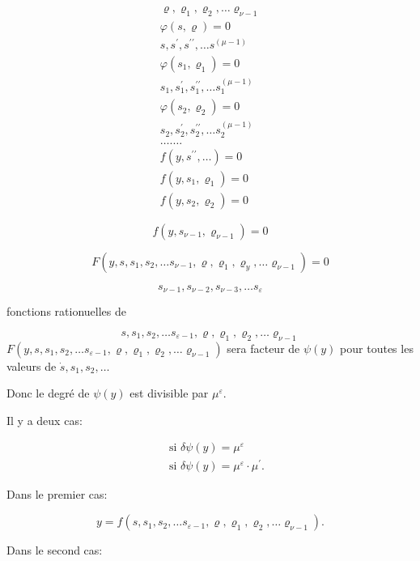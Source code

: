 \documentclass{article}
\begin{document}
\[
\begin{gathered}
\varrho, \varrho_{1}, \varrho_{2}, \ldots \varrho_{\nu-1} \\
\varphi(s, \varrho)=0 \\
s, s^{\prime}, s^{\prime \prime}, \ldots s^{(\mu-1)} \\
\varphi\left(s_{1}, \varrho_{1}\right)=0 \\
s_{1}, s_{1}^{\prime}, s_{1}^{\prime \prime}, \ldots s_{1}^{(\mu-1)} \\
\varphi\left(s_{2}, \varrho_{2}\right)=0 \\
s_{2}, s_{2}^{\prime}, s_{2}^{\prime \prime}, \ldots s_{2}^{(\mu-1)} \\
\ldots . \ldots \\
f\left(y, s^{\prime \prime}, \ldots\right)=0 \\
f\left(y, s_{1}, \varrho_{1}\right)=0 \\
f\left(y, s_{2}, \varrho_{2}\right)=0
\end{gathered}
\]

\[
f\left(y, s_{\nu-1}, \varrho_{\nu-1}\right)=0
\]

\[
F\left(y, s, s_{1}, s_{2}, \ldots s_{\nu-1}, \varrho, \varrho_{1}, \varrho_{y}, \ldots \varrho_{\nu-1}\right)=0
\]

\[
s_{\nu-1}, s_{\nu-2}, s_{\nu-3}, \ldots s_{\varepsilon}
\]

fonctions rationuelles de

\[
s, s_{1}, s_{2}, \ldots s_{\varepsilon-1}, \varrho, \varrho_{1}, \varrho_{2}, \ldots \varrho_{\nu-1}
\]
\(F\left(y, s, s_{1}, s_{2}, \ldots s_{\varepsilon-1}, \varrho, \varrho_{1}, \varrho_{2}, \ldots \varrho_{\nu-1}\right)\) sera facteur de \(\psi(y)\) pour toutes les valeurs de \(\dot{s}, s_{1}, s_{2}, \ldots\)

Donc le degré de \(\psi(y)\) est divisible par \(\mu^{\varepsilon}\).

Il y a deux cas:

\[
\begin{aligned}
& \text { si } \delta \psi(y)=\mu^{\varepsilon} \\
& \text { si } \delta \psi(y)=\mu^{\varepsilon} \cdot \mu^{\prime} .
\end{aligned}
\]

Dans le premier cas:

\[
y=f\left(s, s_{1}, s_{2}, \ldots s_{\varepsilon-1}, \varrho, \varrho_{1}, \varrho_{2}, \ldots \varrho_{\nu-1}\right) .
\]

Dans le second cas:
\end{document}
